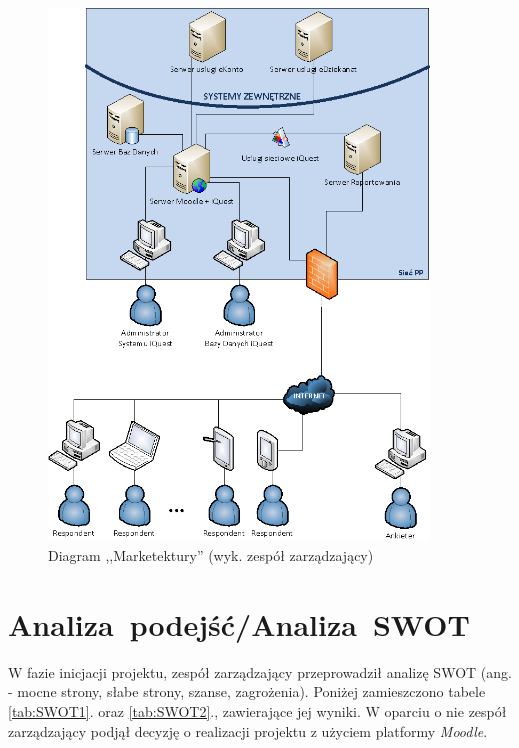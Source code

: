 \begin{figure}[H]
\centering\includegraphics[width=0.9\textwidth]{figures/marketecture}
\caption{Diagram ,,Marketektury'' (wyk. zespół zarządzający)}\label{rys:marketecture}
\end{figure}

\section{Analiza~podejść\slash Analiza~SWOT}
\label{Chapter53}

W fazie inicjacji projektu, zespół zarządzający przeprowadził analizę SWOT (ang.  - mocne strony, słabe strony, szanse, zagrożenia). Poniżej zamieszczono tabele \ref{tab:SWOT1}. oraz \ref{tab:SWOT2}., zawierające jej wyniki. W oparciu o nie zespół zarządzający podjął decyzję o realizacji projektu z użyciem platformy \textit{Moodle}.


